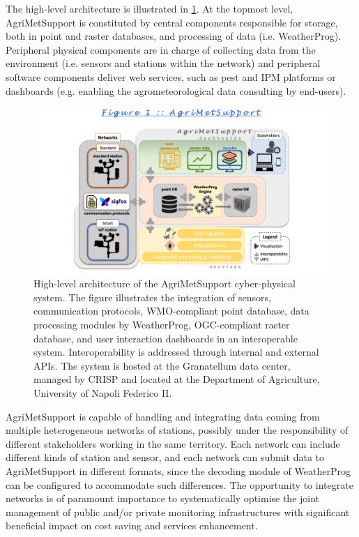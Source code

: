 \documentclass[authoryear,preprint,review,12pt]{elsarticle}
\begin{document}
The high-level architecture is illustrated in \cref{cyberPhysicalSystemFig}.
At the topmost level, AgriMetSupport is constituted by central components responsible for storage, both in point and raster databases, and processing of data (i.e. WeatherProg).
Peripheral physical components are in charge of collecting data from the environment (i.e. sensors and stations within the network) and peripheral software components deliver web services, such as pest and IPM platforms or dashboards (e.g. enabling the agrometeorological data consulting by end-users).
\begin{figure}[!t] %
	\centering %
	\includegraphics[angle=0,scale=.56,trim=4.6cm 0cm 2cm 2.4cm,clip]{figures/Fig01_AgriMetSupport.png}
	\caption{
            High-level architecture of the Agri\-Met\-Support cyber-physical system. The figure illustrates the integration of sensors, communication protocols, WMO-compliant point database, data processing modules by WeatherProg, OGC-compliant raster database, and user interaction dashboards in an interoperable system. Interoperability is addressed through internal and external APIs. The system is hosted at the Granatellum data center, managed by CRISP and located at the Department of Agriculture, University of Napoli Federico II.
 }
	\label{cyberPhysicalSystemFig}
\end{figure}
Agri\-Met\-Support is capable of handling and integrating data coming from multiple heterogeneous networks of stations, possibly under the responsibility of different stakeholders working in the same territory.
Each network can include different kinds of station and sensor, and each network can submit data to AgriMetSupport in different formats, since the decoding module of WeatherProg can be configured to accommodate such differences.
The opportunity to integrate networks is of paramount importance to sys\-tem\-at\-ic\-al\-ly
 optimise the joint management of public and/or private monitoring infrastructures with significant beneficial impact on cost saving and services enhancement.
\end{document}
